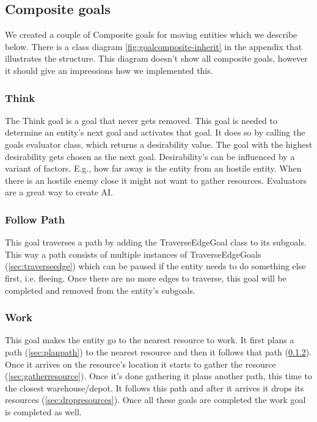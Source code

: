 \subsection{Composite goals} 
We created a couple of Composite goals for moving entities which we describe 
below. There is a class diagram \cref{fig:goalcomposite-inherit} in the 
appendix that illustrates the structure. This diagram doesn't show all 
composite goals, however it should give an impressions how we implemented this. 

\subsubsection{Think} 
The Think goal is a goal that never gets removed. This goal is needed to 
determine an entity's next goal and activates that goal. It does so by calling 
the goals evaluator class, which returns a desirability value. The goal with 
the highest desirability gets chosen as the next goal. Desirability’s can be 
influenced by a variant of factors. E.g., how far away is the entity from an 
hostile entity. When there is an hostile enemy close it might not want to 
gather resources. Evaluators are a great way to create AI. 

\subsubsection{Follow Path} 
\label{sec:followpath} 
This goal traverses a path by adding the TraverseEdgeGoal class to its subgoals. 
This way a path consists of multiple instances of TraverseEdgeGoals 
(\cref{sec:traverseedge}) which can be paused if the entity needs to do 
something else first, i.e. fleeing. Once there are no more edges to traverse, 
this goal will be completed and removed from the entity's subgoals.

\subsubsection{Work} 
This goal makes the entity go to the nearest resource to work. It first plans 
a path (\cref{sec:planpath}) to the nearest resource and then it follows that 
path (\cref{sec:followpath}). Once it arrives on the resource's location it 
starts to gather the resource (\cref{sec:gatherresource}). Once it's done 
gathering it plans another path, this time to the closest warehouse/depot. It 
follows this path and after it arrives it drops its resources 
(\cref{sec:dropresources}). Once all these goals are completed the work goal 
is completed as well.

